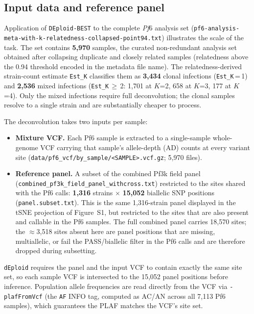 \documentclass{article}
\begin{document}
\subsection{Input data and reference panel}
\label{sec:field-input}

Application of \texttt{DEploid-BEST} to the complete \emph{Pf}6 analysis set
(\texttt{pf6-analysis-meta-with-k-relatedness-collapsed-point94.txt})
illustrates the scale of the task. The set contains \textbf{5,970} samples, the curated non-redundant analysis
set obtained after collapsing duplicate and closely related samples
(relatedness above the 0.94 threshold encoded in the metadata file name). The
relatedness-derived strain-count estimate \texttt{Est\_K} classifies them as
\textbf{3,434} clonal infections (\texttt{Est\_K}\,=\,1) and \textbf{2,536}
mixed infections (\texttt{Est\_K}\,$\geq$\,2: 1,701 at $K$=2, 658 at $K$=3,
177 at $K$=4). Only the mixed infections require full deconvolution; the
clonal samples resolve to a single strain and are substantially cheaper to
process.

The deconvolution takes two inputs per sample:
\begin{itemize}
  \item \textbf{Mixture VCF.} Each Pf6 sample is extracted to a single-sample
    whole-genome VCF carrying that sample's allele-depth (AD) counts at every
    variant site
    (\texttt{data/pf6\_vcf/by\_sample/<SAMPLE>.vcf.gz}; 5,970 files).
  \item \textbf{Reference panel.} A subset of the combined Pf3k field panel
    (\texttt{combined\_pf3k\_field\_panel\_withcross.txt}) restricted to the
    sites shared with the Pf6 calls: \textbf{1,316} strains
    $\times$ \textbf{15,052} biallelic SNP positions
    (\texttt{panel.subset.txt}). This is the same 1,316-strain panel
    displayed in the tSNE projection of Figure~S1, but restricted to the
    sites that are also present and callable in the Pf6 samples. The full
    combined panel carries 18,570 sites; the $\approx$3,518 sites absent
    here are panel positions that are missing, multiallelic, or fail the
    PASS/biallelic filter in the Pf6 calls and are therefore dropped during
    subsetting.
\end{itemize}
\texttt{dEploid} requires the panel and the input VCF to contain exactly the
same site set, so each sample VCF is intersected to the 15,052 panel
positions before inference. Population allele frequencies are read directly
from the VCF via \texttt{-plafFromVcf} (the \texttt{AF} INFO tag, computed as
AC/AN across all 7,113 Pf6 samples), which guarantees the PLAF matches the
VCF's site set.
\end{document}
